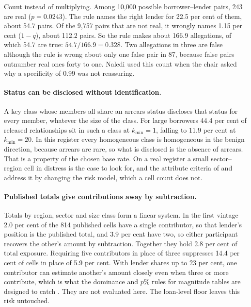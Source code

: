 \begin{example}\label{c13:ex-pairs}
Count instead of multiplying. Among 10,000 possible borrower--lender pairs, 243 are real
($p = 0.0243$). The rule names the right lender for 22.5 per cent of them, about 54.7
pairs. Of the 9,757 pairs that are not real, it wrongly names 1.15 per cent ($1 - q$),
about 112.2 pairs. So the rule makes about 166.9 allegations, of which 54.7 are true:
$54.7/166.9 = 0.328$. Two allegations in three are false although the rule is wrong about
only one false pair in 87, because false pairs outnumber real ones forty to one. Naledi
used this count when the chair asked why a specificity of 0.99 was not reassuring.
\end{example}


\paragraph{Status can be disclosed without identification.} A key class whose members
all share an arrears status discloses that status for every member, whatever the
size of the class. For large borrowers 44.4 per cent of released relationships sit in
such a class at $k_{\min}=1$, falling to 11.9 per cent at $k_{\min}=20$.
In this register every homogeneous class is homogeneous in the benign direction,
because arrears are rare, so what is disclosed is the absence of arrears. That is a
property of the chosen base rate. On a real register a small sector--region cell in
distress is the case to look for, and the attribute criteria of
\citet{machanavajjhala2007} and \citet{li2007} address it by changing the risk model,
which a cell count does not.

\paragraph{Published totals give contributions away by subtraction.} Totals by
region, sector and size class form a linear system. In the first vintage 2.0 per cent
of the 814 published cells have a single contributor, so that lender's position is
the published total, and 3.9 per cent have two, so either participant recovers the
other's amount by subtraction. Together they hold 2.8 per cent of total exposure.
Requiring five contributors in place of three suppresses 14.4 per cent of cells in
place of 5.9 per cent.
With lender shares up to 23 per cent, one contributor can estimate another's amount
closely even when three or more contribute, which is what the dominance and $p\%$
rules for magnitude tables are designed to catch \citep[ch.~4]{hundepool2012}. They
are not evaluated here. The loan-level floor leaves this risk untouched.

